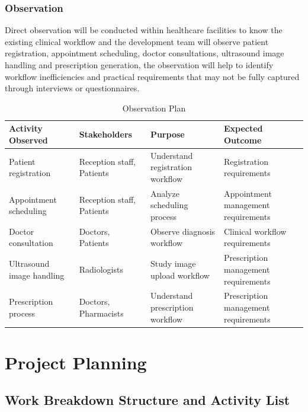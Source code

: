 \documentclass[12pt,a4paper]{report}
\begin{document}
\subsection{Observation}

Direct observation will be conducted within healthcare facilities to know the existing clinical workflow and the development team will observe patient registration, appointment scheduling, doctor consultations, ultrasound image handling and prescription generation, the observation will help to identify workflow inefficiencies and practical requirements that may not be fully captured through interviews or questionnaires.

\begin{table}[H]
\centering
\caption{Observation Plan}
\begin{tabular}{|p{4cm}|p{3.5cm}|p{3cm}|p{4cm}|}
\hline
\textbf{Activity Observed} & \textbf{Stakeholders} & \textbf{Purpose} & \textbf{Expected Outcome} \\
\hline
Patient registration & Reception staff, Patients & Understand registration workflow & Registration requirements \\
\hline
Appointment scheduling & Reception staff, Patients & Analyze scheduling process & Appointment management requirements \\
\hline
Doctor consultation & Doctors, Patients & Observe diagnosis workflow & Clinical workflow requirements \\
\hline
Ultrasound image handling & Radiologists & Study image upload workflow & Prescription management requirements \\
\hline
Prescription process & Doctors, Pharmacists & Understand prescription workflow & Prescription management requirements \\
\hline
\end{tabular}
\end{table}

\chapter{Project Planning}

\section{Work Breakdown Structure and Activity List}
\end{document}
